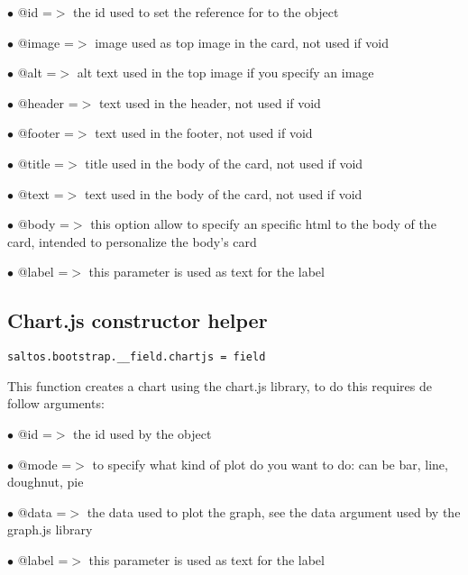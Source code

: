 \documentclass[a4paper]{book}
\begin{document}
\begin{compactitem}
\item[\color{myblue}$\bullet$] @id     =$>$ the id used to set the reference for to the object
\item[\color{myblue}$\bullet$] @image  =$>$ image used as top image in the card, not used if void
\item[\color{myblue}$\bullet$] @alt    =$>$ alt text used in the top image if you specify an image
\item[\color{myblue}$\bullet$] @header =$>$ text used in the header, not used if void
\item[\color{myblue}$\bullet$] @footer =$>$ text used in the footer, not used if void
\item[\color{myblue}$\bullet$] @title  =$>$ title used in the body of the card, not used if void
\item[\color{myblue}$\bullet$] @text   =$>$ text used in the body of the card, not used if void
\item[\color{myblue}$\bullet$] @body   =$>$ this option allow to specify an specific html to the body of the card, intended
           to personalize the body's card
\item[\color{myblue}$\bullet$] @label  =$>$ this parameter is used as text for the label
\end{compactitem}

\hypertarget{toc462}{}
\subsection{Chart.js constructor helper}

\begin{lstlisting}
saltos.bootstrap.__field.chartjs = field
\end{lstlisting}

This function creates a chart using the chart.js library, to do this requires de follow arguments:

\begin{compactitem}
\item[\color{myblue}$\bullet$] @id    =$>$ the id used by the object
\item[\color{myblue}$\bullet$] @mode  =$>$ to specify what kind of plot do you want to do: can be bar, line, doughnut, pie
\item[\color{myblue}$\bullet$] @data  =$>$ the data used to plot the graph, see the data argument used by the graph.js library
\item[\color{myblue}$\bullet$] @label =$>$ this parameter is used as text for the label
\end{compactitem}
\end{document}
